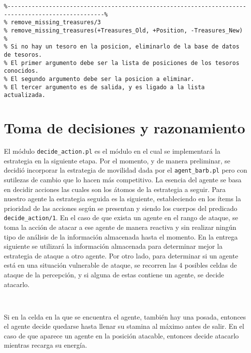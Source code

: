 \documentclass[a4paper,12pt]{report}
\begin{document}
\begin{scriptsize}
\begin{verbatim}
%--------------------------------------------------------------------------------------------------%
% remove_missing_treasures/3
% remove_missing_treasures(+Treasures_Old, +Position, -Treasures_New)
% 
% Si no hay un tesoro en la posicion, eliminarlo de la base de datos de tesoros.
% El primer argumento debe ser la lista de posiciones de los tesoros conocidos. 
% El segundo argumento debe ser la posicion a eliminar.
% El tercer argumento es de salida, y es ligado a la lista actualizada.
\end{verbatim}
\end{scriptsize}

\chapter{Toma de decisiones y razonamiento}

El m\'{o}dulo \texttt{decide\_action.pl} es el m\'{o}dulo en el cual se implementar\'{a} la 
estrategia en la siguiente etapa. 
Por el momento, y de manera preliminar, se decidi\'{o} incorporar la estrategia de movilidad dada 
por el \texttt{agent\_barb.pl} pero con sutilezas de cambio que lo hacen m\'{a}s competitivo.
La esencia del agente se basa en decidir acciones las cuales son los \'{a}tomos de la estrategia a 
seguir. 
Para nuestro agente la estrategia seguida es la siguiente, estableciendo en los \'{i}tems la 
prioridad de las acciones según se presentan y siendo los cuerpos del predicado 
\texttt{decide\_action/1}.
En el caso de que exista un agente en el rango de ataque, se toma la acci\'{o}n de atacar a ese 
agente de manera reactiva y sin realizar ningún tipo de an\'{a}lisis de la informaci\'{o}n 
almacenada hasta el momento. 
En la entrega siguiente se utilizar\'{a} la informaci\'{o}n almacenada para determinar mejor la 
estrategia de ataque a otro agente. 
Por otro lado, para determinar si un agente est\'{a} en una situaci\'{o}n vulnerable de ataque, se 
recorren las 4 posibles celdas de ataque de la percepci\'{o}n, y si alguna de estas contiene un 
agente, se decide atacarlo. 

\ 



Si en la celda en la que se encuentra el agente, tambi\'{e}n hay una posada, entonces el agente 
decide quedarse hasta llenar su stamina al m\'{a}ximo antes de salir. 
En el caso de que aparece un agente en la posici\'{o}n atacable, entonces decide atacarlo mientras 
recarga su energ\'{i}a.
\end{document}

